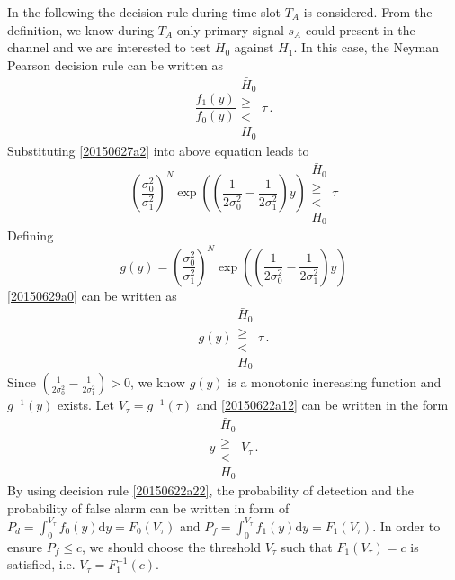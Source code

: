 In the following the decision rule during time slot $T_A$ is considered. From the definition, we know during $T_A$ only primary signal $s_A$ could present in the channel and we are interested to test $H_0$ against $H_1$. In this case, the Neyman Pearson decision rule can be written as
\begin{equation}
  \frac{f_1(y)}{f_0(y)} \substack{\bar{H}_0 \\ \geq \\ < \\ H_0} \tau\,.
\end{equation}
Substituting \eqref{20150627a2} into above equation leads to 
\begin{equation}
  \left(\frac{\sigma_0^2}{\sigma_1^2}\right)^N\exp\left( (\frac{1}{2\sigma_0^2} -  \frac{1}{2\sigma_1^2}  )y \right)\substack{\bar{H}_0 \\ \geq \\ < \\ H_0} \tau
\end{equation}
Defining 
\begin{equation}
  g(y) = \left(\frac{\sigma_0^2}{\sigma_1^2}\right)^N\exp\left( (\frac{1}{2\sigma_0^2} -  \frac{1}{2\sigma_1^2}  )y \right)
  \label{20150629a0}
\end{equation}
\eqref{20150629a0} can be written as
\begin{equation}
  g(y) \substack{\bar{H}_0 \\ \geq \\ < \\ H_0} \tau\,.
  \label{20150622a12}
\end{equation}
Since $(\frac{1}{2\sigma_0^2} -  \frac{1}{2\sigma_1^2}  ) >  0$, we know $g(y)$ is a monotonic increasing function and $g^{-1}(y) $ exists.  
Let $V_\tau = g^{-1}(\tau)$ and \eqref{20150622a12} can be written in the form 
\begin{equation}
  y  \substack{\bar{H}_0 \\ \geq \\ < \\ H_0} V_\tau\,.
  \label{20150622a22}
\end{equation}
By using decision rule \eqref{20150622a22}, the probability of detection and the probability of false alarm can be written in form of 
$  P_d = \int_{0}^{V_\tau} f_0(y) \mathrm{d}y = F_0(V_\tau)$ and
$  P_f = \int_{0}^{V_\tau} f_1(y) \mathrm{d}y= F_1(V_\tau)$.
In order to ensure $P_f \leq c$, we should choose the threshold $V_\tau$ such that $F_1(V_\tau) = c$ is satisfied, i.e. $V_\tau = F^{-1}_1(c)$. 

